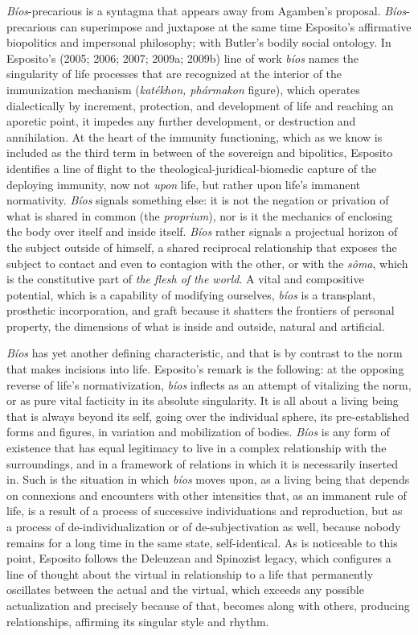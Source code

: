 \documentclass[a4paper,]{scrartcl}
\begin{document}
\emph{Bíos}-precarious is a syntagma that appears away from Agamben's
proposal. \emph{Bíos}-precarious can superimpose and juxtapose at the
same time Esposito's affirmative biopolitics and impersonal philosophy;
with Butler's bodily social ontology. In Esposito's (2005; 2006; 2007;
2009a; 2009b) line of work \emph{bíos} names the singularity of life
processes that are recognized at the interior of the immunization
mechanism (\emph{katékhon, phármakon} figure), which operates
dialectically by increment, protection, and development of life and
reaching an aporetic point, it impedes any further development, or
destruction and annihilation. At the heart of the immunity functioning,
which as we know is included as the third term in between of the
sovereign and bipolitics, Esposito identifies a line of flight to the
theological-juridical-biomedic capture of the deploying immunity, now
not \emph{upon} life, but rather upon life's immanent normativity.
\emph{Bíos} signals something else: it is not the negation or privation
of what is shared in common (the \emph{proprium}), nor is it the
mechanics of enclosing the body over itself and inside itself.
\emph{Bíos} rather signals a projectual horizon of the subject outside
of himself, a shared reciprocal relationship that exposes the subject to
contact and even to contagion with the other, or with the \emph{sôma},
which is the constitutive part of \emph{the flesh of the world}. A vital
and compositive potential, which is a capability of modifying ourselves,
\emph{bíos} is a transplant, prosthetic incorporation, and graft because
it shatters the frontiers of personal property, the dimensions of what
is inside and outside, natural and artificial.

\emph{Bíos} has yet another defining characteristic, and that is by
contrast to the norm that makes incisions into life. Esposito's remark
is the following: at the opposing reverse of life's normativization,
\emph{bíos} inflects as an attempt of vitalizing the norm, or as pure
vital facticity in its absolute singularity. It is all about a living
being that is always beyond its self, going over the individual sphere,
its pre-established forms and figures, in variation and mobilization of
bodies. \emph{Bíos} is any form of existence that has equal legitimacy
to live in a complex relationship with the surroundings, and in a
framework of relations in which it is necessarily inserted in. Such is
the situation in which \emph{bíos} moves upon, as a living being that
depends on connexions and encounters with other intensities that, as an
immanent rule of life, is a result of a process of successive
individuations and reproduction, but as a process of
de-individualization or of de-subjectivation as well, because nobody
remains for a long time in the same state, self-identical. As is
noticeable to this point, Esposito follows the Deleuzean and Spinozist
legacy, which configures a line of thought about the virtual in
relationship to a life that permanently oscillates between the actual
and the virtual, which exceeds any possible actualization and precisely
because of that, becomes along with others, producing relationships,
affirming its singular style and rhythm.
\end{document}
